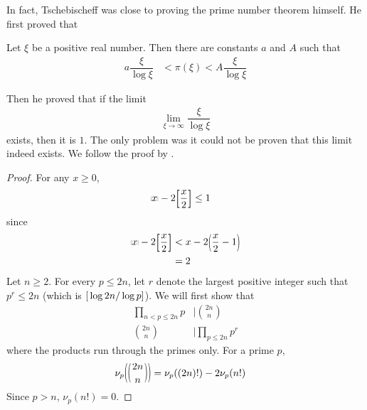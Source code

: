 \documentclass[elemannt.tex]{subfile}
\begin{document}
	In fact, Tschebischeff was close to proving the prime number theorem himself. He first proved that
		\begin{theorem}
			Let $\xi$ be a positive real number. Then there are constants $a$ and $A$ such that
				\begin{align*}
					a\dfrac{\xi}{\log{\xi}}
						& < \pi(\xi) < A\dfrac{\xi}{\log{\xi}}
				\end{align*}
		\end{theorem}
	Then he proved that if the limit
		\begin{align*}
			\lim_{\xi\to\infty}\dfrac{\xi}{\log{\xi}}
		\end{align*}
	exists, then it is $1$. The only problem was it could not be proven that this limit indeed exists. We follow the proof by \textcite[Theorem 112]{landau_1969}.
		\begin{proof}
			For any $x\geq 0$,
				\begin{align*}
					\floor{x}-2\floor{\dfrac{x}{2}}
						& \leq 1
				\end{align*}
			since
				\begin{align*}
					\floor{x}-2\floor{\dfrac{x}{2}}
						& < x-2\parenthesis{\dfrac{x}{2}-1}\\
						& = 2
				\end{align*}
			Let $n\geq2$. For every $p\leq2n$, let $r$ denote the largest positive integer such that $p^{r}\leq2n$ (which is $\floor{\log{2n}/\log{p}}$). We will first show that
				\begin{align}
					\prod_{n<p\leq 2n}p
						& \mid \binom{2n}{n}\label{eqn:1}\\
					\binom{2n}{n}
						& \mid \prod_{p\leq 2n}p^{r}
				\end{align}
			where the products run through the primes only. For a prime $p$,
				\begin{align*}
					\nu_{p}\parenthesis{\binom{2n}{n}}
						& = \nu_{p}((2n)!)-2\nu_{p}(n!)
				\end{align*}
			Since $p>n$, $\nu_{p}(n!)=0$.
		\end{proof}
\end{document}

